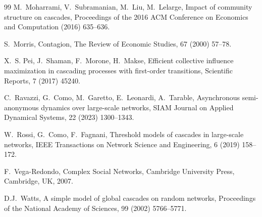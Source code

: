 \documentclass[12pt,twoside,reqno]{amsart}
\theoremstyle{definition}
\numberwithin{equation}{section}
\newcommand{\0}{\mathbf{0}}
\newcommand{\1}{\mathbf{1}}
\begin{document}
\begin{thebibliography}{99}
 M.~Moharrami, V.~Subramanian, M.~Liu, M.~Lelarge, Impact of community structure on cascades, Proceedings of the 2016 ACM Conference on Economics and Computation (2016) 635--636.

 S.~Morris, Contagion, The Review of Economic Studies, 67 (2000) 57--78.

 X.~S. Pei, J.~Shaman, F.~Morone, H.~Makse, Efficient collective influence maximization in cascading processes with first-order transitions,  Scientific Reports, 7 (2017) 45240.

 C.~Ravazzi, G.~Como, M.~Garetto, E.~Leonardi, A.~Tarable, Asynchronous semi-anonymous dynamics over large-scale networks, SIAM Journal on Applied Dynamical Systems,  22 (2023) 1300--1343.

 W.~Rossi, G.~Como, F.~Fagnani, Threshold models of cascades in large-scale networks,  IEEE Transactions on Network Science and Engineering, 6 (2019) 158--172.

 F.~Vega-Redondo, Complex Social Networks, Cambridge University Press, Cambridge, UK, 2007.

 D.J.~Watts, A simple model of global cascades on random networks, Proceedings of the National Academy of Sciences, 99 (2002) 5766--5771.
















\end{thebibliography}
\end{document}
